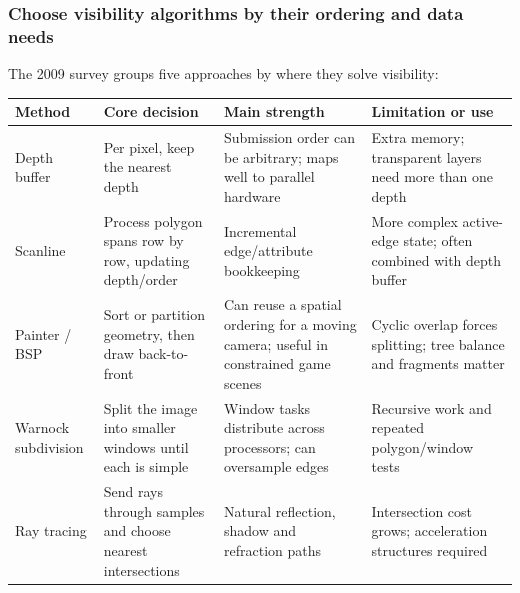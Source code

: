 \subsubsection{Choose visibility algorithms by their ordering and data needs}\label{04-visual-computing-ii-ch029-choose-visibility-algorithms-by-their-ordering-and-data-needs}

\hypertarget{04-visual-computing-ii-ch029-choose-visibility-algorithms-by-their-ordering-and-data-needs}{}

The 2009 survey groups five approaches by where they solve visibility:

{\def\LTcaptype{none} %
\begin{longtable}[]{@{}
  >{\raggedright\arraybackslash}p{}
  >{\raggedright\arraybackslash}p{}
  >{\raggedright\arraybackslash}p{}
  >{\raggedright\arraybackslash}p{}@{}}
\toprule\noalign{}
\begin{minipage}[b]{\linewidth}\raggedright
Method
\end{minipage} & \begin{minipage}[b]{\linewidth}\raggedright
Core decision
\end{minipage} & \begin{minipage}[b]{\linewidth}\raggedright
Main strength
\end{minipage} & \begin{minipage}[b]{\linewidth}\raggedright
Limitation or use
\end{minipage} \\
\midrule\noalign{}
\endhead
\bottomrule\noalign{}
\endlastfoot
Depth buffer & Per pixel, keep the nearest depth & Submission order can be arbitrary; maps well to parallel hardware & Extra memory; transparent layers need more than one depth \\
Scanline & Process polygon spans row by row, updating depth/order & Incremental edge/attribute bookkeeping & More complex active-edge state; often combined with depth buffer \\
Painter / BSP & Sort or partition geometry, then draw back-to-front & Can reuse a spatial ordering for a moving camera; useful in constrained game scenes & Cyclic overlap forces splitting; tree balance and fragments matter \\
Warnock subdivision & Split the image into smaller windows until each is simple & Window tasks distribute across processors; can oversample edges & Recursive work and repeated polygon/window tests \\
Ray tracing & Send rays through samples and choose nearest intersections & Natural reflection, shadow and refraction paths & Intersection cost grows; acceleration structures required \\
\end{longtable}
}

